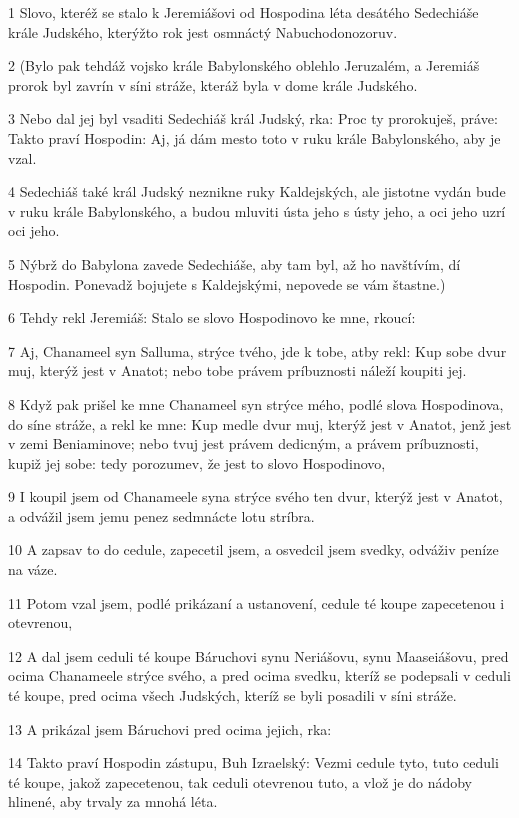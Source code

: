 \par 1 Slovo, kteréž se stalo k Jeremiášovi od Hospodina léta desátého Sedechiáše krále Judského, kterýžto rok jest osmnáctý Nabuchodonozoruv.
\par 2 (Bylo pak tehdáž vojsko krále Babylonského oblehlo Jeruzalém, a Jeremiáš prorok byl zavrín v síni stráže, kteráž byla v dome krále Judského.
\par 3 Nebo dal jej byl vsaditi Sedechiáš král Judský, rka: Proc ty prorokuješ, práve: Takto praví Hospodin: Aj, já dám mesto toto v ruku krále Babylonského, aby je vzal.
\par 4 Sedechiáš také král Judský neznikne ruky Kaldejských, ale jistotne vydán bude v ruku krále Babylonského, a budou mluviti ústa jeho s ústy jeho, a oci jeho uzrí oci jeho.
\par 5 Nýbrž do Babylona zavede Sedechiáše, aby tam byl, až ho navštívím, dí Hospodin. Ponevadž bojujete s Kaldejskými, nepovede se vám štastne.)
\par 6 Tehdy rekl Jeremiáš: Stalo se slovo Hospodinovo ke mne, rkoucí:
\par 7 Aj, Chanameel syn Salluma, strýce tvého, jde k tobe, atby rekl: Kup sobe dvur muj, kterýž jest v Anatot; nebo tobe právem príbuznosti náleží koupiti jej.
\par 8 Když pak prišel ke mne Chanameel syn strýce mého, podlé slova Hospodinova, do síne stráže, a rekl ke mne: Kup medle dvur muj, kterýž jest v Anatot, jenž jest v zemi Beniaminove; nebo tvuj jest právem dedicným, a právem príbuznosti, kupiž jej sobe: tedy porozumev, že jest to slovo Hospodinovo,
\par 9 I koupil jsem od Chanameele syna strýce svého ten dvur, kterýž jest v Anatot, a odvážil jsem jemu penez sedmnácte lotu stríbra.
\par 10 A zapsav to do cedule, zapecetil jsem, a osvedcil jsem svedky, odváživ peníze na váze.
\par 11 Potom vzal jsem, podlé prikázaní a ustanovení, cedule té koupe zapecetenou i otevrenou,
\par 12 A dal jsem ceduli té koupe Báruchovi synu Neriášovu, synu Maaseiášovu, pred ocima Chanameele strýce svého, a pred ocima svedku, kteríž se podepsali v ceduli té koupe, pred ocima všech Judských, kteríž se byli posadili v síni stráže.
\par 13 A prikázal jsem Báruchovi pred ocima jejich, rka:
\par 14 Takto praví Hospodin zástupu, Buh Izraelský: Vezmi cedule tyto, tuto ceduli té koupe, jakož zapecetenou, tak ceduli otevrenou tuto, a vlož je do nádoby hlinené, aby trvaly za mnohá léta.
